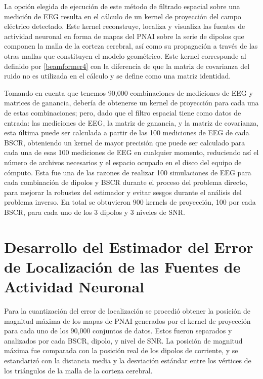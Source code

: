 La opción elegida de ejecución de este método de filtrado espacial sobre una medición de EEG resulta en el cálculo de un kernel de proyección del campo eléctrico detectado. Este kernel reconstruye, localiza y visualiza las fuentes de actividad neuronal en forma de mapas del PNAI sobre la serie de dipolos que componen la malla de la corteza cerebral, así como su propagación a través de las otras mallas que constituyen el modelo geométrico. Este kernel corresponde al definido por \cref{beamformer4} con la diferencia de que la matriz de covarianza del ruido no es utilizada en el cálculo y se define como una matriz identidad.

Tomando en cuenta que tenemos 90,000 combinaciones de mediciones de EEG y matrices de ganancia, debería de obtenerse un kernel de proyección para cada una de estas combinaciones; pero, dado que el filtro espacial tiene como datos de entrada: las mediciones de EEG, la matriz de ganancia, y la matriz de covarianza, esta última puede ser calculada a partir de las 100 mediciones de EEG de cada BSCR, obteniendo un kernel de mayor precisión que puede ser calculado para cada una de esas 100 mediciones de EEG en cualquier momento, reduciendo así el número de archivos necesarios y el espacio ocupado en el disco del equipo de cómputo. Esta fue una de las razones de realizar 100 simulaciones de EEG para cada combinación de dipolos y BSCR durante el proceso del problema directo, para mejorar la robustez del estimador y evitar sesgos durante el análisis del problema inverso. En total se obtuvieron 900 kernels de proyección, 100 por cada BSCR, para cada uno de los 3 dipolos y 3 niveles de SNR.


\section{Desarrollo del Estimador del Error de Localización de las Fuentes de Actividad Neuronal}
\label{sec:methodology:estimator}

Para la cuantización del error de localización se procedió obtener la posición de magnitud máxima de los mapas de PNAI generados por el kernel de proyección para cada uno de los 90,000 conjuntos de datos. Estos fueron separados y analizados por cada BSCR, dipolo, y nivel de SNR. La posición de magnitud máxima fue comparada con la posición real de los dipolos de corriente, y se estandarizó con la distancia media y la desviación estándar entre los vértices de los triángulos de la malla de la corteza cerebral. 

